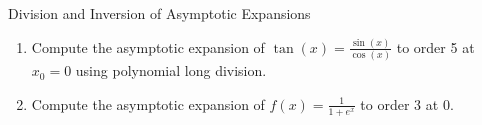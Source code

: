 \begin{exercise}{Division and Inversion of Asymptotic Expansions}
\begin{enumerate}[leftmargin=1.5em,itemsep=2pt]
  \item Compute the asymptotic expansion of $\tan(x) = \frac{\sin(x)}{\cos(x)}$ to order 5 at $x_0 = 0$ using polynomial long division.
  \item Compute the asymptotic expansion of $f(x) = \frac{1}{1 + e^x}$ to order 3 at $0$.
\end{enumerate}
\end{exercise}

\begin{tabletworkspace}[5.0cm]
\end{tabletworkspace}

